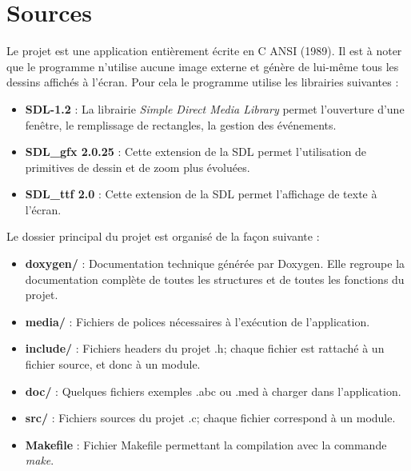\documentclass[12pt]{report}
\begin{document}
\section{Sources}
Le projet est une application entièrement écrite en C ANSI (1989). 
Il est à noter que le programme n'utilise aucune image externe et génère de lui-même tous les dessins affichés à l'écran. Pour cela le programme utilise les librairies suivantes :\\
\begin{itemize}
 \item \textbf{SDL-1.2} : La librairie \textit{Simple Direct Media Library} permet l'ouverture d'une fenêtre, le remplissage de rectangles, la gestion des événements.\\
 \item \textbf{SDL\_gfx 2.0.25} : Cette extension de la SDL permet l'utilisation de primitives de dessin et de zoom plus évoluées.\\
 \item \textbf{SDL\_ttf 2.0} : Cette extension de la SDL permet l'affichage de texte à l'écran. \\
\end{itemize}
 Le dossier principal du projet est organisé de la façon suivante :\\
\begin{itemize}
 \item \textbf{doxygen/} : Documentation technique générée par Doxygen. Elle regroupe la documentation complète de toutes les structures et de toutes les fonctions du projet.\\
 \item \textbf{media/} : Fichiers de polices nécessaires à l'exécution de l'application.\\
 \item \textbf{include/} : Fichiers headers du projet .h; chaque fichier est rattaché à un fichier source, et donc à un module.\\
 \item \textbf{doc/} : Quelques fichiers exemples .abc ou .med à charger dans l'application.\\
 \item \textbf{src/} : Fichiers sources du projet .c; chaque fichier correspond à un module. \\
 \item \textbf{Makefile} : Fichier Makefile permettant la compilation avec la commande \textit{make}.\\
\end{itemize}
\end{document}
